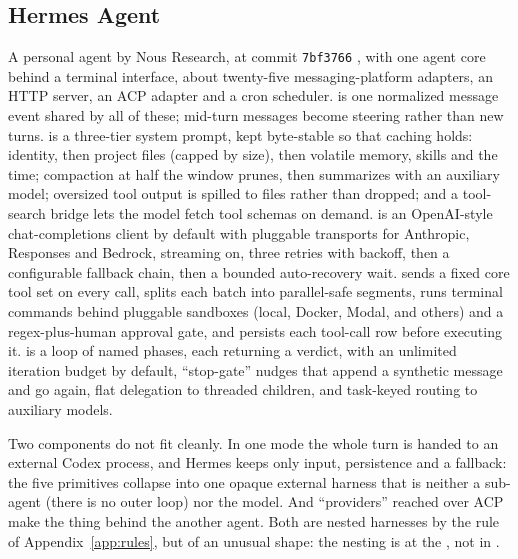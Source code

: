 \subsection{Hermes Agent}
A personal agent by Nous Research, at commit \texttt{7bf3766} \citep{hermes}, with one agent core behind a terminal interface, about twenty-five messaging-platform adapters, an HTTP server, an ACP adapter and a cron scheduler.  is one normalized message event shared by all of these; mid-turn messages become steering rather than new turns.  is a three-tier system prompt, kept byte-stable so that caching holds: identity, then project files (capped by size), then volatile memory, skills and the time; compaction at half the window prunes, then summarizes with an auxiliary model; oversized tool output is spilled to files rather than dropped; and a tool-search bridge lets the model fetch tool schemas on demand.  is an OpenAI-style chat-completions client by default with pluggable transports for Anthropic, Responses and Bedrock, streaming on, three retries with backoff, then a configurable fallback chain, then a bounded auto-recovery wait.  sends a fixed core tool set on every call, splits each batch into parallel-safe segments, runs terminal commands behind pluggable sandboxes (local, Docker, Modal, and others) and a regex-plus-human approval gate, and persists each tool-call row before executing it.  is a loop of named phases, each returning a verdict, with an unlimited iteration budget by default, ``stop-gate'' nudges that append a synthetic message and go again, flat delegation to threaded children, and task-keyed routing to auxiliary models.

Two components do not fit cleanly. In one mode the whole turn is handed to an external Codex process, and Hermes keeps only input, persistence and a fallback: the five primitives collapse into one opaque external harness that is neither a sub-agent (there is no outer loop) nor the model. And ``providers'' reached over ACP make the thing behind the  another agent. Both are nested harnesses by the rule of Appendix~\ref{app:rules}, but of an unusual shape: the nesting is at the , not in .


